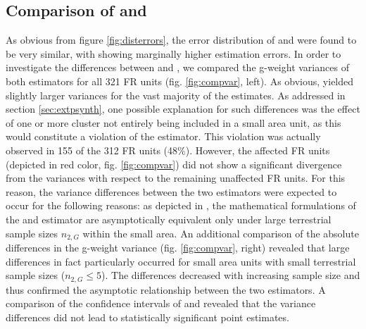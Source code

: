 %
%
%
%
%
%
%



\newpage
\subsection{Comparison of \psmall{} and \extpsynth{}}
\label{sec:comp}

As obvious from figure \ref{fig:disterrors}, the error distribution of \psmall{} and \extpsynth{} were found to be very similar, with \psmall{} showing marginally higher estimation errors. In order to investigate the differences between \psmall{} and \extpsynth{}, we compared the g-weight variances of both estimators for all 321 FR units (fig. \ref{fig:compvar}, left). As obvious, \psmall{} yielded slightly larger variances for the vast majority of the estimates. As addressed in section \ref{sec:extpsynth}, one possible explanation for such differences was the effect of one or more cluster not entirely being included in a small area unit, as this would constitute a violation of the \extpsynth{} estimator. This violation was actually observed in 155 of the 312 FR units (48\%). However, the affected FR units (depicted in red color, fig. \ref{fig:compvar}) did not show a significant divergence from the \psmall{} variances with respect to the remaining unaffected FR units. For this reason, the variance differences between the two estimators were expected to occur for the following reasons: as depicted in \citet[pp.17--18]{mandallaz2016}, the mathematical formulations of the \psmall{} and \extpsynth{} estimator are asymptotically equivalent only under large terrestrial sample sizes $n_{2,G}$ within the small area. An additional comparison of the absolute differences in the g-weight variance (fig. \ref{fig:compvar}, right) revealed that large differences in fact particularly occurred for small area units with small terrestrial sample sizes ($n_{2,G} \leq 5$). The differences decreased with increasing sample size and thus confirmed the asymptotic relationship between the two estimators. A comparison of the confidence intervals of \psmall{} and \extpsynth{} revealed that the variance differences did not lead to statistically significant point estimates.\par

